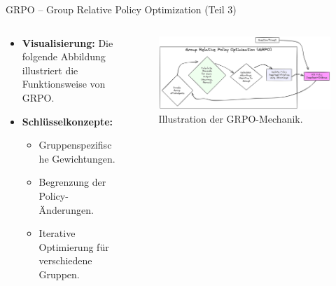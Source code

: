 \documentclass[aspectratio=1610, xcolor=dvipsnames, 9pt]{beamer}
\begin{document}
\begin{frame}{GRPO – Group Relative Policy Optimization (Teil 3)}
  \begin{columns}
    \begin{column}{0.5\textwidth}
      \begin{itemize}
        \item \textbf{Visualisierung:} Die folgende Abbildung illustriert die Funktionsweise von GRPO.
        \item \textbf{Schlüsselkonzepte:}
          \begin{itemize}
            \item Gruppenspezifische Gewichtungen.
            \item Begrenzung der Policy-Änderungen.
            \item Iterative Optimierung für verschiedene Gruppen.
          \end{itemize}
      \end{itemize}
    \end{column}
    \begin{column}{0.5\textwidth}
      \begin{figure}
        \centering
        \includegraphics[width=\textwidth]{images/GRPO.png}
        \caption{Illustration der GRPO-Mechanik.}
      \end{figure}
    \end{column}
  \end{columns}
\end{frame}
\end{document}
